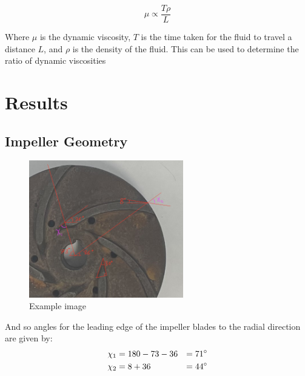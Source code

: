 \documentclass{article}
\begin{document}
\begin{equation}
    \mu \propto \frac{T\rho}{L}
\end{equation}
    
Where $\mu$ is the dynamic viscosity, $T$ is the time taken for the fluid to travel a distance $L$, and $\rho$ is the density of the fluid.
This can be used to determine the ratio of dynamic viscosities


\section{Results}


\subsection{Impeller Geometry}

\begin{figure}[H]
    \centering
    \includegraphics[width=0.6\textwidth]{impeller_annotations.png}
    \caption{Example image}
    \label{fig:impeller_annotations}
\end{figure}

And so angles for the leading edge of the impeller blades to the radial direction are given by:
\begin{alignat}{2}
    \chi_1 &= 180-73-36 &= 71^\circ \notag \\
    \chi_2 &= 8 + 36 &= 44^\circ \notag
\end{alignat}
\end{document}
